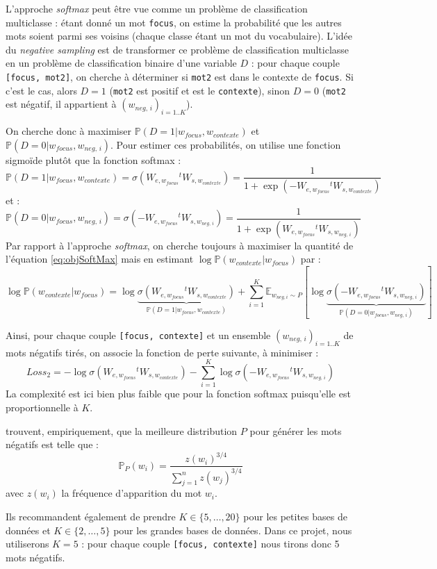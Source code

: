 \documentclass[11pt,french,french]{article}
\begin{document}
L'approche \emph{softmax} peut être vue comme un problème de
classification multiclasse : étant donné un mot \texttt{focus}, on
estime la probabilité que les autres mots soient parmi ses voisins
(chaque classe étant un mot du vocabulaire). L'idée du \emph{negative
sampling} est de transformer ce problème de classification multiclasse
en un problème de classification binaire d'une variable \(D\) : pour
chaque couple \texttt{{[}focus,\ mot2{]}}, on cherche à déterminer si
\texttt{mot2} est dans le contexte de \texttt{focus}. Si c'est le cas,
alors \(D=1\) (\texttt{mot2} est positif et est le \texttt{contexte}),
sinon \(D=0\) (\texttt{mot2} est négatif, il appartient à
\((w_{neg,\,i})_{i=1..K}\)).

On cherche donc à maximiser
\(\mathbb P(D=1\vert w_{focus},w_{contexte})\) et
\(\mathbb P(D=0\vert w_{focus},w_{neg,\,i})\). Pour estimer ces
probabilités, on utilise une fonction sigmoïde plutôt que la fonction
softmax : \[
\mathbb P(D=1\vert w_{focus},w_{contexte})=\sigma(W_{e,w_{focus}}{}^tW_{s,w_{contexte}}) = 
\frac{1}{1+\exp(-W_{e,w_{focus}}{}^tW_{s,w_{contexte}})}
\] et : \[
\mathbb P(D=0\vert w_{focus},w_{neg,\,i})=\sigma(-W_{e,w_{focus}}{}^tW_{s,w_{neg,\,i}}) = 
\frac{1}{1+\exp(W_{e,w_{focus}}{}^tW_{s,w_{neg,\,i}})}
\] Par rapport à l'approche \emph{softmax}, on cherche toujours à
maximiser la quantité de l'équation \eqref{eq:objSoftMax} mais en estimant
\(\log\mathbb P(w_{contexte}\vert w_{focus})\) par : \[
\log\mathbb P(w_{contexte}\vert w_{focus}) =
\log\underbrace{\sigma (W_{e,w_{focus}}{}^tW_{s,w_{contexte}})}_{
\mathbb P(D=1\vert w_{focus},w_{contexte})
}+
\sum_{i=1}^K\mathbb E_{w_{neg,i}\sim P}[
\log
\underbrace{\sigma (-W_{e,w_{focus}}{}^tW_{s,w_{neg,\,i}})}_{
\mathbb P(D=0\vert w_{focus},w_{neg,\,i})
}
]
\]

Ainsi, pour chaque couple \texttt{{[}focus,\ contexte{]}} et un ensemble
\((w_{neg,\,i})_{i=1..K}\) de mots négatifs tirés, on associe la
fonction de perte suivante, à minimiser : \[
Loss_{2}=-\log\sigma (W_{e,w_{focus}}{}^tW_{s,w_{contexte}})
-
\sum_{i=1}^K
\log
\sigma (-W_{e,w_{focus}}{}^tW_{s,w_{neg,\,i}})
\] La complexité est ici bien plus faible que pour la fonction softmax
puisqu'elle est proportionnelle à \(K\).

\cite{MikolovNS} trouvent, empiriquement, que la meilleure distribution
\(P\) pour générer les mots négatifs est telle que : \[
\mathbb P_P(w_i) = \frac{z(w_i)^{3/4}}{
\sum_{j=1}^n z(w_j)^{3/4}
}
\] avec \(z(w_i)\) la fréquence d'apparition du mot \(w_i\).

Ils recommandent également de prendre \(K\in\{5,\dots,20\}\) pour les
petites bases de données et \(K\in\{2,\dots,5\}\) pour les grandes bases
de données. Dans ce projet, nous utiliserons \(K=5\) : pour chaque
couple \texttt{{[}focus,\ contexte{]}} nous tirons donc 5 mots négatifs.
\end{document}
